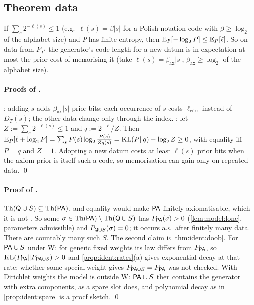 \subsection{Theorem data}\label{app:pa:theorems}

\begin{proposition}[Gibbs]\pabrk{}\label{prop:pa:gibbs}
If $\sum_s2^{-\ell(s)}\le1$ (e.g.\ $\ell(s)=\beta|s|$ for a Polish-notation code with $\beta\ge\log_2$ of the alphabet size) and $P$ has finite entropy, then $\mathbb{E}_P[-\log_2P]\le\mathbb{E}_P[\ell]$. So on data from $P_{T^*}$ the generator's code length for a new datum is in expectation at most the prior cost of memorising it (take $\ell(s)=\beta_{\mathrm{ax}}|s|$, $\beta_{\mathrm{ax}}\ge\log_2$ of the alphabet size).
\end{proposition}

\paragraph{Proofs of .} : adding $s$ adds $\beta_{\mathrm{ax}}|s|$ prior bits; each occurrence of $s$ costs $\ell_{\mathrm{cite}}$ instead of $D_T(s)$; the other data change only through the index. : let $Z:=\sum_s2^{-\ell(s)}\le1$ and $q:=2^{-\ell}/Z$. Then $\mathbb{E}_P[\ell+\log_2P]=\sum_sP(s)\log_2\frac{P(s)}{Zq(s)}=\mathrm{KL}(P\|q)-\log_2Z\ge0$, with equality iff $P=q$ and $Z=1$. Adopting a new datum costs at least $\ell(s)$ prior bits when the axiom prior is itself such a code, so memorisation can gain only on repeated data. \qed

\paragraph{Proof of .} $\mathrm{Th}(\mathsf{Q}\cup S)\subseteq\mathrm{Th}(\mathsf{PA})$, and equality would make $\mathsf{PA}$ finitely axiomatisable, which it is not \citep{rylln1952axiomatizability}. So some $\sigma\in\mathrm{Th}(\mathsf{PA})\setminus\mathrm{Th}(\mathsf{Q}\cup S)$ has $P_{\mathsf{PA}}(\sigma)>0$ (\cref{lem:model:lone}, parameters admissible) and $P_{\mathsf{Q}\cup S}(\sigma)=0$; it occurs a.s.\ after finitely many data. There are countably many such $S$. The second claim is \cref{thm:ident:doob}. For $\mathsf{PA}\cup S$ under W: for generic fixed weights its law differs from $P_{\mathsf{PA}}$, so $\mathrm{KL}(P_{\mathsf{PA}}\|P_{\mathsf{PA}\cup S})>0$ and \cref{prop:ident:rates}(a) gives exponential decay at that rate; whether some special weight gives $P_{\mathsf{PA}\cup S}=P_{\mathsf{PA}}$ was not checked. With Dirichlet weights the model is outside W: $\mathsf{PA}\cup S$ then contains the generator with extra components, as a spare slot does, and polynomial decay as in \cref{prop:ident:spare} is a proof sketch. \qed

